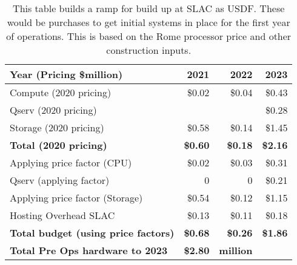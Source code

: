 \tiny \begin{longtable} {|l |r  |r  |r |} \caption{This table builds a ramp for build up at SLAC as USDF. These would be purchases to get initial systems in place for the first year of operations. This is based on the Rome processor price and other construction inputs. \label{tab:preOps}}\\ 
\hline 
\textbf{Year (Pricing \$million)}&\textbf{2021}&\textbf{2022}&\textbf{2023} \\ \hline
{Compute (2020 pricing)}&{\$0.02}&{\$0.04}&{\$0.43} \\ \hline
{Qserv (2020 pricing)}&{}&{}&{\$0.28} \\ \hline
{Storage (2020 pricing)}&{\$0.58}&{\$0.14}&{\$1.45} \\ \hline
\textbf{Total (2020 pricing)}&\textbf{\$0.60}&\textbf{\$0.18}&\textbf{\$2.16} \\ \hline
{Applying price factor (CPU)}&{\$0.02}&{\$0.03}&{\$0.31} \\ \hline
{Qserv (applying factor)}&{0}&{0}&{\$0.21} \\ \hline
{Applying price factor (Storage)}&{\$0.54}&{\$0.12}&{\$1.15} \\ \hline
{Hosting Overhead SLAC}&{\$0.13}&{\$0.11}&{\$0.18} \\ \hline
\textbf{Total budget (using price factors)}&\textbf{\$0.68}&\textbf{\$0.26}&\textbf{\$1.86} \\ \hline
\textbf{Total Pre Ops hardware to 2023}&\textbf{\$2.80}&\textbf{million}& \\ \hline
\end{longtable} \normalsize
